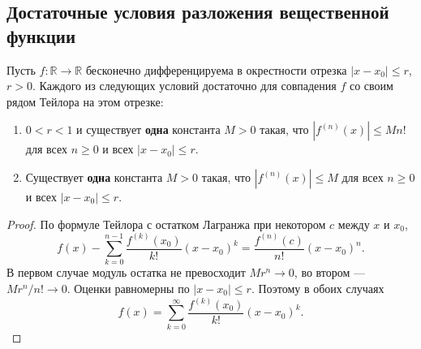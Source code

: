 \subsection{Достаточные условия разложения вещественной функции}\label{sec-power-series-04-1}

\begin{theorem}\label{thm-taylor-sufficient}

Пусть \(f:\mathbb R\to\mathbb R\) бесконечно дифференцируема в окрестности отрезка \(|x-x_0|\le r\), \(r>0\). Каждого из следующих условий достаточно для совпадения \(f\) со своим рядом Тейлора на этом отрезке:

\begin{enumerate}
\def\labelenumi{\arabic{enumi}.}
\tightlist
\item
  \(0<r<1\) и существует \textbf{одна} константа \(M>0\) такая, что \(|f^{(n)}(x)|\le M n!\) для всех \(n\ge0\) и всех \(|x-x_0|\le r\).
\item
  Существует \textbf{одна} константа \(M>0\) такая, что \(|f^{(n)}(x)|\le M\) для всех \(n\ge0\) и всех \(|x-x_0|\le r\).
\end{enumerate}

\end{theorem}

\begin{proof}

По формуле Тейлора с остатком Лагранжа при некотором \(c\) между \(x\) и \(x_0\), \[
f(x)-\sum_{k=0}^{n-1}\frac{f^{(k)}(x_0)}{k!}(x-x_0)^k
=\frac{f^{(n)}(c)}{n!}(x-x_0)^n.
\] В первом случае модуль остатка не превосходит \(Mr^n\to0\), во втором --- \(Mr^n/n!\to0\). Оценки равномерны по \(|x-x_0|\le r\). Поэтому в обоих случаях \[
f(x)=\sum_{k=0}^\infty\frac{f^{(k)}(x_0)}{k!}(x-x_0)^k.
\]

\end{proof}
